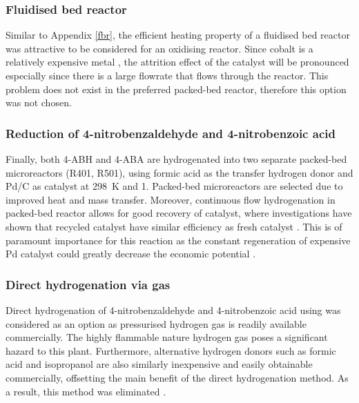 \subsubsection{Fluidised bed reactor}
Similar to Appendix \ref{fbr}, the efficient heating property of a fluidised bed reactor was attractive to be considered for an oxidising reactor. Since cobalt is a relatively expensive metal \cite{saib_fundamental_2014}, the attrition effect of the catalyst will be pronounced especially since there is a large flowrate that flows through the reactor. This problem does not exist in the preferred packed-bed reactor, therefore this option was not chosen.

\subsubsection{Reduction of 4-nitrobenzaldehyde and 4-nitrobenzoic acid}

Finally, both 4-ABH and 4-ABA are hydrogenated into two separate packed-bed microreactors (R401, R501), using formic acid as the transfer hydrogen donor and Pd/C as catalyst at \SI{298}{\K} and \SI{1}{\atm}. Packed-bed microreactors are selected due to improved heat and mass transfer. Moreover, continuous flow hydrogenation in packed-bed reactor allows for good recovery of catalyst, where investigations have shown that recycled catalyst have similar efficiency as fresh catalyst \cite{rahman_fast_2020}. This is of paramount importance for this reaction as the constant regeneration of expensive Pd catalyst could greatly decrease the economic potential \cite{rahman_fast_2020}. 


\subsubsection{Direct hydrogenation via  gas}

Direct hydrogenation of 4-nitrobenzaldehyde and 4-nitrobenzoic acid using  was considered as an option as pressurised hydrogen gas is readily available commercially. The highly flammable nature hydrogen gas poses a significant hazard to this plant. Furthermore, alternative hydrogen donors such as formic acid and isopropanol are also similarly inexpensive and easily obtainable commercially, offsetting the main benefit of the direct hydrogenation method. As a result, this method was eliminated \cite{wang_golden_nodate}. 






